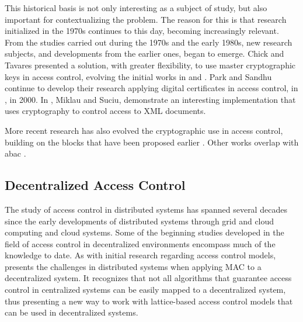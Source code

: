 This historical basis is not only interesting as a subject of study, but also important for contextualizing the problem. The reason for this is that research initialized in the 1970s continues to this day, becoming increasingly relevant. From the studies carried out during the 1970s and the early 1980s, new research subjects, and developments from the earlier ones, began to emerge. Chick and Tavares presented a solution, with greater flexibility, to use master cryptographic keys \cite{brassard_flexible_1990} in access control, evolving the initial works in \cite{akl_cryptographic_1983} and \cite{denning_master_1981}. Park and Sandhu continue to develop their research applying digital certificates in access control, in \cite{park_binding_2000}, in 2000. In \cite{miklau_controlling_2003}, Miklau and Suciu, demonstrate an interesting implementation that uses cryptography to control access to XML documents.

More recent research has also evolved the cryptographic use in access control, building on the blocks that have been proposed earlier \cite{di_vimercati_over-encryption:_2007}. Other works overlap with \gls{abac} \cite{wan_hasbe:_2012, ruj_privacy_2012, wang_hierarchical_2010, goyal_attribute-based_2006, harrington_cryptographic_2003}.

\subsection{Decentralized Access Control}

The study of access control in distributed systems has spanned several decades since the early developments of distributed systems through grid and cloud computing and cloud systems. Some of the beginning studies developed in the field of access control in decentralized environments \cite{karger_non-discretionary_1977} encompass much of the knowledge to date. As with initial research regarding access control models, \citeauthor{karger_non-discretionary_1977} presents the challenges in distributed systems when applying MAC to a decentralized system. It recognizes that not all algorithms that guarantee access control in centralized systems can be easily mapped to a decentralized system, thus presenting a new way to work with lattice-based access control models that can be used in decentralized systems.

